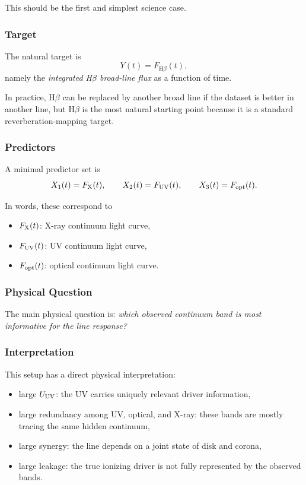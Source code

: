 \documentclass{article}
\begin{document}
This should be the first and simplest science case.

\subsubsection{Target}

The natural target is
\[
Y(t)=F_{\mathrm{H}\beta}(t),
\]
namely the \emph{integrated H$\beta$ broad-line flux} as a function of time.

In practice, H$\beta$ can be replaced by another broad line if the dataset is better in another line, but H$\beta$ is the most natural starting point because it is a standard reverberation-mapping target.

\subsubsection{Predictors}

A minimal predictor set is
\[
X_1(t)=F_{\rm X}(t), \qquad
X_2(t)=F_{\rm UV}(t), \qquad
X_3(t)=F_{\rm opt}(t).
\]

In words, these correspond to
\begin{itemize}
    \item \(F_{\rm X}(t)\): X-ray continuum light curve,
    \item \(F_{\rm UV}(t)\): UV continuum light curve,
    \item \(F_{\rm opt}(t)\): optical continuum light curve.
\end{itemize}

\subsubsection{Physical Question}

The main physical question is: \emph{which observed continuum band is most informative for the line response?}

\subsubsection{Interpretation}

This setup has a direct physical interpretation:
\begin{itemize}
    \item large \(U_{\rm UV}\): the UV carries uniquely relevant driver information,
    \item large redundancy among UV, optical, and X-ray: these bands are mostly tracing the same hidden continuum,
    \item large synergy: the line depends on a joint state of disk and corona,
    \item large leakage: the true ionizing driver is not fully represented by the observed bands.
\end{itemize}
\end{document}
